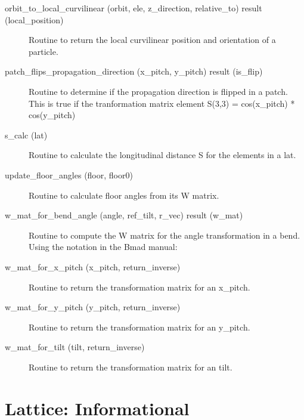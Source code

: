 \begin{description}
\label{r:orbit.to.local.curvilinear}
\item[orbit_to_local_curvilinear (orbit, ele, z_direction, relative_to) result (local_position)] \Newline 
Routine to return the local curvilinear position and orientation of a particle.

\label{r:patch.flips.propagation.direction}
\item[patch_flips_propagation_direction (x_pitch, y_pitch) result (is_flip)] \Newline 
Routine to determine if the propagation direction is flipped in a patch.
This is true if the tranformation matrix element S(3,3) = cos(x_pitch) * cos(y_pitch) 

\label{r:s.calc}
\item[s_calc (lat)] \Newline
Routine to calculate the longitudinal distance S for the elements in a lat. 

\label{r:update.floor.angles}
\item[update_floor_angles (floor, floor0)] \Newline 
Routine to calculate floor angles from its W matrix.

\label{r:w.mat.for.bend.angle}
\item[w_mat_for_bend_angle (angle, ref_tilt, r_vec) result (w_mat)] \Newline 
Routine to compute the W matrix for the angle transformation in a bend.
Using the notation in the Bmad manual:

\label{r:w.mat.for.x.pitch}
\item[w_mat_for_x_pitch (x_pitch, return_inverse)] \Newline 
Routine to return the transformation matrix for an x_pitch.

\label{r:w.mat.for.y.pitch}
\item[w_mat_for_y_pitch (y_pitch, return_inverse)] \Newline 
Routine to return the transformation matrix for an y_pitch.

\label{r:w.mat.for.tilt}
\item[w_mat_for_tilt (tilt, return_inverse)] \Newline 
Routine to return the transformation matrix for an tilt.

\end{description}

\section{Lattice: Informational}
\label{r:info}     

